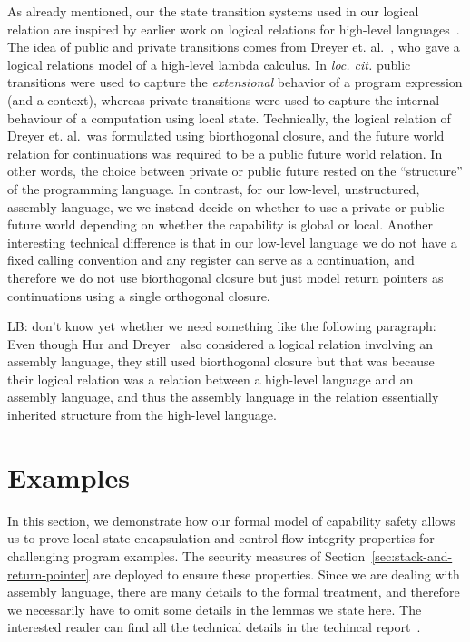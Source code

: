 \documentclass[compsoc,conference,letterpaper,fleqn]{IEEEtran}
\newcommand\lars[1]{{\color{purple} \sf \footnotesize {LB: #1}}\\}
\begin{document}

As already mentioned, our the state transition systems used in our
logical relation are inspired by earlier work on logical relations for
high-level
languages~\cite{Ahmed:popl09, Dreyer:jfp12,Devriese:2016ObjCap}.
The idea of public and private transitions comes from 
Dreyer et. al.~\cite{Dreyer:jfp12}, who gave a logical relations model
of a high-level lambda calculus. In \emph{loc. cit.}
public transitions were used to 
capture the \emph{extensional} behavior of a program expression
(and a context), whereas private transitions were used to capture
the internal behaviour of a computation using local state.
Technically, the logical relation of Dreyer et. al.\ was
formulated using biorthogonal closure, and the future world
relation for continuations was required to be a public future world
relation. In other words, the choice between private or public future
rested on the ``structure'' of the programming language. 
In contrast, 
for our low-level, unstructured, assembly language, we
we instead decide on whether to use a private or public future 
world depending on whether the capability is global or local. 
Another interesting technical difference is that in our low-level 
language we do not have a fixed calling convention and any register
can serve as a continuation, and therefore we do not use biorthogonal
closure but just model return pointers as continuations using a single
orthogonal closure. 

\lars{don't know yet whether we need something like the following paragraph:}
Even though 
Hur and Dreyer~\cite{Hur:2011:KLR:1926385.1926402} also
considered a logical
relation involving an assembly language, they still used
biorthogonal closure but that was because their logical relation
was a relation between a high-level language and an assembly
language,  and thus the assembly language in the relation essentially
inherited structure from the high-level language.



\section{Examples}
\label{sec:examples}
In this section, we demonstrate how our formal model of capability
safety allows us to prove local state encapsulation and control-flow
integrity properties for challenging program examples. The security
measures of Section~\ref{sec:stack-and-return-pointer} are deployed to
ensure these properties. Since we are dealing with assembly language,
there are many details to the formal treatment, and therefore we
necessarily have to omit some details in the lemmas we state here.
The interested reader can find all the technical details in the
techincal report~\cite{XXX}.
\end{document}
